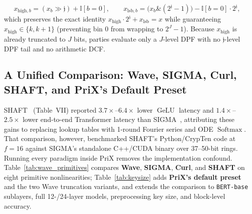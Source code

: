 \documentclass[11pt]{article}
\begin{document}
\begin{itemize}
    \begin{equation}
        x_{\text{high}, b} = (x_b \gg \mathfrak{j}) + \mathbb{I}[b = 0], \qquad
        x_{\text{lsb}, b} = \big(x_b \mathbin{\&} (2^{\mathfrak{j}} - 1)\big) - \mathbb{I}[b = 0]\cdot 2^{\mathfrak{j}},
        \label{eq:wave_prob_split}
    \end{equation}
    which preserves the exact identity $x_{\text{high}} \cdot 2^{\mathfrak{j}} + x_{\text{lsb}} = x$ while guaranteeing $x_{\text{high}} \in \{k, k+1\}$ (preventing bin $0$ from wrapping to $2^J - 1$). Because $x_{\text{high}}$ is already truncated to $J$ bits, parties evaluate only a $J$-level DPF with no $\mathfrak{j}$-level DPF tail and no arithmetic DCF.
\end{itemize}

\subsection{A Unified Comparison: Wave, SIGMA, Curl, SHAFT, and PriX's Default Preset}
\label{sec:unified}\label{sec:shaft_vs_sigma_wave}\label{sec:keysize}

SHAFT~\cite{kei2025shaft} (Table~VII) reported $3.7\times$--$6.4\times$ lower $\operatorname{GeLU}$ latency and $1.4\times$--$2.5\times$ lower end-to-end Transformer latency than SIGMA~\cite{gupta2024sigma}, attributing these gains to replacing lookup tables with 1-round Fourier series and ODE $\operatorname{Softmax}$. That comparison, however, benchmarked SHAFT's Python/CrypTen code at $f=16$ against SIGMA's standalone C++/CUDA binary over 37--50-bit rings. Running every paradigm inside PriX removes the implementation confound. Table~\ref{tab:wave_primitives} compares \textbf{Wave}, \textbf{SIGMA}, \textbf{Curl}, and \textbf{SHAFT} on eight primitive nonlinearities; Table~\ref{tab:keysize} adds \textbf{PriX's default preset} and the two Wave truncation variants, and extends the comparison to \texttt{BERT-base} sublayers, full 12-/24-layer models, preprocessing key size, and block-level accuracy.

\begin{table}[t]
\centering
\caption{\textbf{Cross-paradigm comparison of Wave, SIGMA, Curl, and SHAFT on primitive nonlinearities ($N=1000$ elements)} in PriX (2 parties, CPU, $f=16$). We report online communication rounds, per-party online communication (bytes/element), local CPU execution time (ms), and mean absolute error (MAE) against float64.}
\label{tab:wave_primitives}
\vspace{2pt}
\footnotesize
{}
\end{table}
\end{document}
